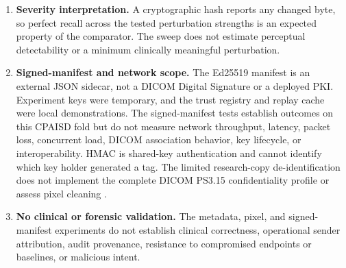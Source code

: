 \documentclass[journal]{IEEEtran}
\begin{document}
\begin{enumerate}[leftmargin=*]
    \item \textbf{Severity interpretation.} A cryptographic hash reports any changed byte, so perfect recall across the tested perturbation strengths is an expected property of the comparator. The sweep does not estimate perceptual detectability or a minimum clinically meaningful perturbation.
    \item \textbf{Signed-manifest and network scope.} The Ed25519 manifest is an external JSON sidecar, not a DICOM Digital Signature or a deployed PKI. Experiment keys were temporary, and the trust registry and replay cache were local demonstrations. The signed-manifest tests establish outcomes on this CPAISD fold but do not measure network throughput, latency, packet loss, concurrent load, DICOM association behavior, key lifecycle, or interoperability. HMAC is shared-key authentication and cannot identify which key holder generated a tag. The limited research-copy de-identification does not implement the complete DICOM PS3.15 confidentiality profile or assess pixel cleaning \cite{dicomps315}.
    \item \textbf{No clinical or forensic validation.} The metadata, pixel, and signed-manifest experiments do not establish clinical correctness, operational sender attribution, audit provenance, resistance to compromised endpoints or baselines, or malicious intent.
  \end{enumerate}
  
\end{document}
